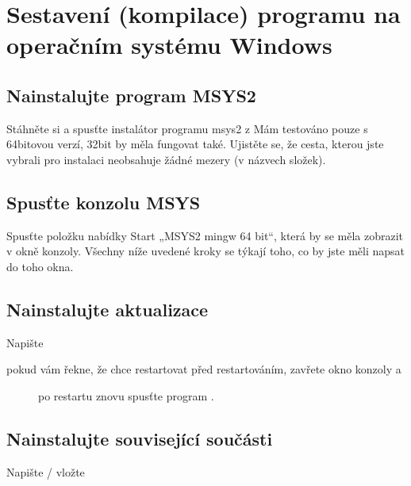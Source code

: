 \documentclass[letterpaper,10pt,czech]{sphinxmanual}
\begin{document}
\chapter{Sestavení (kompilace) programu na operačním systému Windows}
\label{\detokenize{build-win32:sestaveni-kompilace-programu-na-operacnim-systemu-windows}}\label{\detokenize{build-win32::doc}}

\section{Nainstalujte program MSYS2}
\label{\detokenize{build-win32:nainstalujte-program-msys2}}
Stáhněte si a spusťte instalátor programu msys2 z  Mám
testováno pouze s 64bitovou verzí, 32bit by měla fungovat také. Ujistěte se, že cesta, kterou jste vybrali pro instalaci neobsahuje žádné mezery (v názvech složek).


\section{Spusťte konzolu MSYS}
\label{\detokenize{build-win32:spustte-konzolu-msys}}
Spusťte položku nabídky Start „MSYS2 mingw 64 bit“, která by se měla zobrazit
v okně konzoly. Všechny níže uvedené kroky se týkají toho, co by jste měli napsat
do toho okna.


\section{Nainstalujte aktualizace}
\label{\detokenize{build-win32:nainstalujte-aktualizace}}
Napište

\begin{sphinxVerbatim}[commandchars=\\\{\}]
 
\end{sphinxVerbatim}
\begin{description}
\item[{pokud vám řekne, že chce restartovat před restartováním, zavřete okno konzoly a}] \leavevmode
po restartu znovu spusťte program .

\end{description}


\section{Nainstalujte související součásti}
\label{\detokenize{build-win32:nainstalujte-souvisejici-soucasti}}
Napište / vložte
\end{document}
